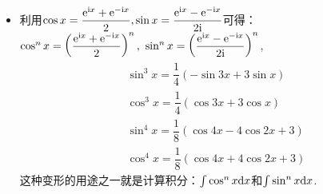 \begin{itemize}[leftmargin=\inteval{\myitemleftmargin}pt,itemsep=
   \inteval{\myitemitempsep}pt,topsep=\inteval{\myitemtopsep}pt]
\item 利用$ \cos x=\dfrac{\mathrm{e}^{\mathrm{i} x}+\mathrm{e}^{-\mathrm{i} x}}{2},
\sin x=\dfrac{\mathrm{e}^{\mathrm{i} x}-\mathrm{e}^{-\mathrm{i} x}}{2\mathrm{i}} $可得：$
\cos^n x=\left( \dfrac{\e^{\i x}+\e^{-\i x}}{2}\right)^n,\ 
\sin^n x=\left(\dfrac{\e^{\i x}-\e^{-\i x}}{2\i}\right)^n $,
\begin{align*}
    &  \sin^3 x=\dfrac{1}{4}(-\sin3x+3\sin x)  \\
    &  \cos^3 x=\dfrac{1}{4}( \cos3x+3\cos x)	\\
    &  \sin^4 x=\dfrac{1}{8}(\cos 4x-4\cos 2x+3)  \\
    &  \cos^4 x=\dfrac{1}{8}(\cos 4x+4\cos 2x+3) 
\end{align*}
这种变形的用途之一就是计算积分：$ \int \cos^n x \mathrm{d} x $和$ \int \sin^n x \mathrm{d} x $. 

\end{itemize}


